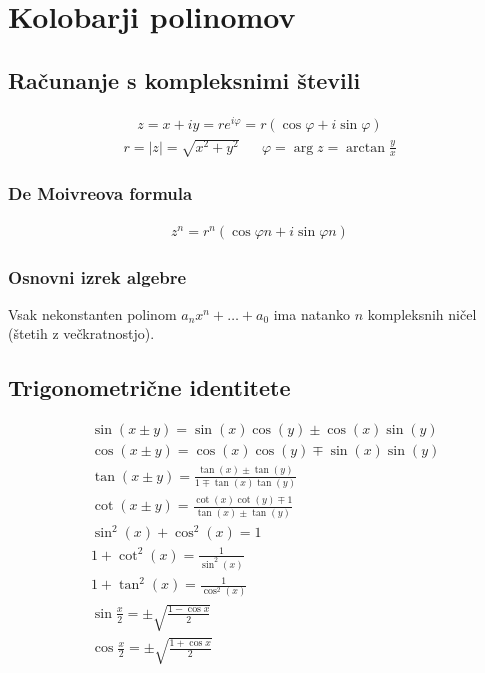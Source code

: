 

	\section{Kolobarji polinomov}
	\subsection*{Računanje s kompleksnimi števili}
	\begin{gather*}
		z = x + iy = r e^{i\varphi} = r\left( \cos \varphi + i \sin \varphi \right)
	\end{gather*}
	\begin{align*}
		r = |z| = \sqrt{x^2 + y^2} && \varphi = \arg z = \arctan \frac{y}{x}
	\end{align*}

	\subsubsection*{De Moivreova formula}
	\begin{align*}
		z^n = r^n\left( \cos \varphi n + i \sin \varphi n \right)
	\end{align*}

	\subsubsection*{Osnovni izrek algebre}
	Vsak nekonstanten polinom $a_n x^n + \dots + a_0$ ima natanko $n$ kompleksnih ničel (štetih z večkratnostjo).

	\subsection*{Trigonometrične identitete}
	\begin{align*}
		&\sin(x \pm y) = \sin(x) \cos(y) \pm \cos(x) \sin(y) \\
		&\cos(x \pm y) = \cos(x) \cos(y) \mp \sin(x) \sin(y)\\
		&\tan(x \pm y) = \frac{\tan(x)\pm \tan(y)}{1 \mp \tan(x) \tan(y)}\\
		&\cot(x \pm y) = \frac{\cot(x)\cot(y) \mp 1}{\tan(x) \pm \tan(y)}\\
		&\sin^2(x)+\cos^2(x) = 1\\
		&1+\cot^2(x) = \frac{1}{\sin^2(x)}\\
		&1+\tan^2(x) = \frac{1}{\cos^2(x)}\\
		&\sin\frac{x}{2} = \pm\sqrt{\frac{1-\cos x}{2}}\\
		&\cos\frac{x}{2} = \pm\sqrt{\frac{1+\cos x}{2}}\\
	\end{align*}

